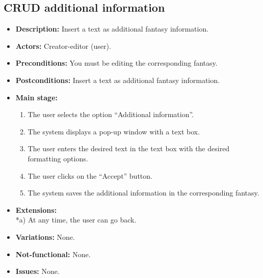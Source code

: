 \subsection{CRUD additional information}
\begin{itemize}
	\item \textbf{Description:} Insert a text as additional fantasy information.
	\item \textbf{Actors:} Creator-editor (user).
	\item \textbf{Preconditions:} You must be editing the corresponding fantasy.
	\item \textbf{Postconditions:} Insert a text as additional fantasy information.
	\item \textbf{Main stage:}
	\begin{enumerate}
		\item The user selects the option ``Additional information''.
		\item The system displays a pop-up window with a text box.
		\item The user enters the desired text in the text box with the desired formatting options.
		\item The user clicks on the ``Accept'' button.
		\item The system saves the additional information in the corresponding fantasy.
	\end{enumerate}
	\item \textbf{Extensions:} \\ *a) At any time, the user can go back.
	\item \textbf{Variations:} None.
	\item \textbf{Not-functional:} None.
	\item \textbf{Issues:} None.
\end{itemize}

